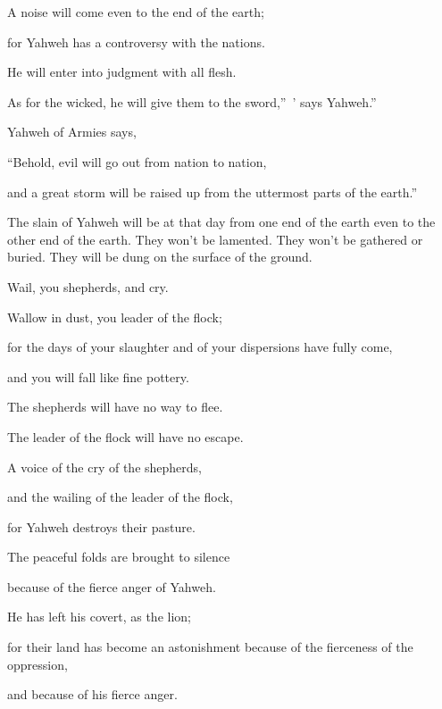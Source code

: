 {\par }{\Q {}A noise will come even to the end of the earth;
\par }{\QB for Yahweh has a controversy with the nations.
\par }{\Q He will enter into judgment with all flesh.
\par }{\QB As for the wicked, he will give them to the sword,” ’ says Yahweh.”
\par }{\PP {}Yahweh of Armies says,
\par }{\Q “Behold, evil will go out from nation to nation,
\par }{\QB and a great storm will be raised up from the uttermost parts of the earth.”
\par }{\MM {}The slain of Yahweh will be at that day from one end of the earth even to the other end of the earth. They won’t be lamented. They won’t be gathered or buried. They will be dung on the surface of the ground.
\par }{\Q {}Wail, you shepherds, and cry.
\par }{\QB Wallow in dust, you leader of the flock;
\par }{\Q for the days of your slaughter and of your dispersions have fully come,
\par }{\QB and you will fall like fine pottery.
\par }{\Q {}The shepherds will have no way to flee.
\par }{\QB The leader of the flock will have no escape.
\par }{\Q {}A voice of the cry of the shepherds,
\par }{\QB and the wailing of the leader of the flock,
\par }{\QB for Yahweh destroys their pasture.
\par }{\Q {}The peaceful folds are brought to silence
\par }{\QB because of the fierce anger of Yahweh.
\par }{\Q {}He has left his covert, as the lion;
\par }{\QB for their land has become an astonishment because of the fierceness of the oppression,
\par }{\QB and because of his fierce anger.

}
